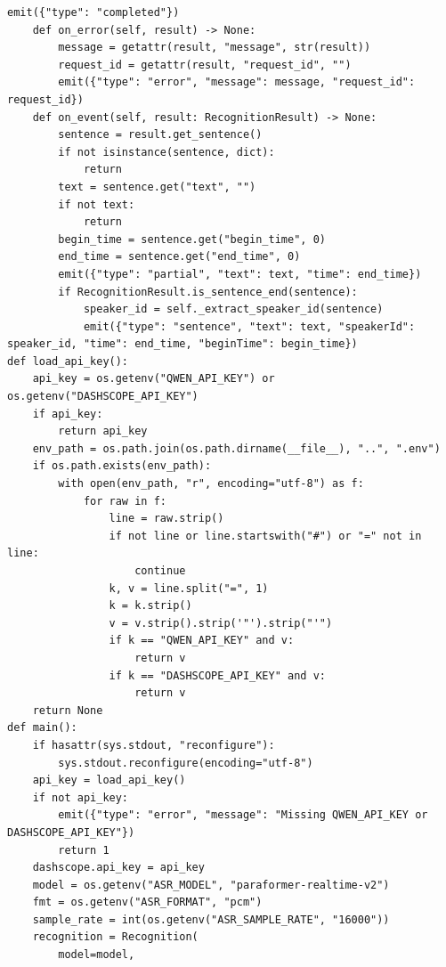 \documentclass[12pt,a4paper]{article}
\begin{document}
\begin{Verbatim}[fontsize=\footnotesize]
        emit({"type": "completed"})
    def on_error(self, result) -> None:
        message = getattr(result, "message", str(result))
        request_id = getattr(result, "request_id", "")
        emit({"type": "error", "message": message, "request_id": request_id})
    def on_event(self, result: RecognitionResult) -> None:
        sentence = result.get_sentence()
        if not isinstance(sentence, dict):
            return
        text = sentence.get("text", "")
        if not text:
            return
        begin_time = sentence.get("begin_time", 0)
        end_time = sentence.get("end_time", 0)
        emit({"type": "partial", "text": text, "time": end_time})
        if RecognitionResult.is_sentence_end(sentence):
            speaker_id = self._extract_speaker_id(sentence)
            emit({"type": "sentence", "text": text, "speakerId": speaker_id, "time": end_time, "beginTime": begin_time})
def load_api_key():
    api_key = os.getenv("QWEN_API_KEY") or os.getenv("DASHSCOPE_API_KEY")
    if api_key:
        return api_key
    env_path = os.path.join(os.path.dirname(__file__), "..", ".env")
    if os.path.exists(env_path):
        with open(env_path, "r", encoding="utf-8") as f:
            for raw in f:
                line = raw.strip()
                if not line or line.startswith("#") or "=" not in line:
                    continue
                k, v = line.split("=", 1)
                k = k.strip()
                v = v.strip().strip('"').strip("'")
                if k == "QWEN_API_KEY" and v:
                    return v
                if k == "DASHSCOPE_API_KEY" and v:
                    return v
    return None
def main():
    if hasattr(sys.stdout, "reconfigure"):
        sys.stdout.reconfigure(encoding="utf-8")
    api_key = load_api_key()
    if not api_key:
        emit({"type": "error", "message": "Missing QWEN_API_KEY or DASHSCOPE_API_KEY"})
        return 1
    dashscope.api_key = api_key
    model = os.getenv("ASR_MODEL", "paraformer-realtime-v2")
    fmt = os.getenv("ASR_FORMAT", "pcm")
    sample_rate = int(os.getenv("ASR_SAMPLE_RATE", "16000"))
    recognition = Recognition(
        model=model,
\end{Verbatim}
\newpage
{}
\fancyhead[R]{}
\end{document}
